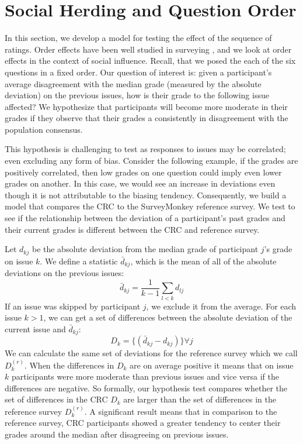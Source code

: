 \section{Social Herding and Question Order}
\label{path}
In this section, we develop a model for testing the effect of the sequence of ratings.
Order effects have been well studied in surveying \cite{krosnick1987evaluation}, and we look at order effects in the context of social influence. 
Recall, that we posed the each of the six questions in a fixed order.
Our question of interest is: given a participant's average disagreement with the median grade (measured by the absolute deviation) on the previous issues, how is their grade to the following issue affected?
We hypothesize that participants will become more moderate in their grades if they observe that their grades a consistently in disagreement with the population consensus.

This hypothesis is challenging to test as responses to issues may be correlated; even excluding any form of bias.
Consider the following example, if the grades are positively correlated, then low grades on one question could imply even lower grades on another.
In this case, we would see an increase in deviations even though it is not attributable to the biasing tendency.
Consequently, we build a model that compares the CRC to the SurveyMonkey reference survey.
We test to see if the relationship between the deviation of a participant's past grades and their current grades is different between the CRC and reference survey.

Let $d_{kj}$ be the absolute deviation from the median grade of participant $j$'s grade on issue $k$. 
We define a statistic $\bar{d}_{kj}$, which is the mean of all of the absolute deviations on the previous issues:
\begin{equation}
\bar{d}_{kj} = \frac{1}{k-1} \sum_{l < k}  d_{lj}
\end{equation}
If an issue was skipped by participant $j$, we exclude it from the average.
For each issue $k > 1$, we can get a set of differences between the absolute deviation of the current issue and $\bar{d}_{kj}$:
\begin{equation}
D_k = \{(\bar{d}_{kj}-d_{kj})\} \forall j
\end{equation}
We can calculate the same set of deviations for the reference survey which we call $D_k^{(r)}$.
When the differences in $D_k$ are on average positive it means that on issue $k$ participants were more moderate than previous issues and vice versa if the differences are negative.
So formally, our hypothesis test compares whether the set of differences in the CRC $D_k$ are larger than the set of differences in the reference survey $D_k^{(r)}$.
A significant result means that in comparison to the reference survey, CRC participants showed a greater tendency to center their grades around the median after disagreeing on previous issues.

